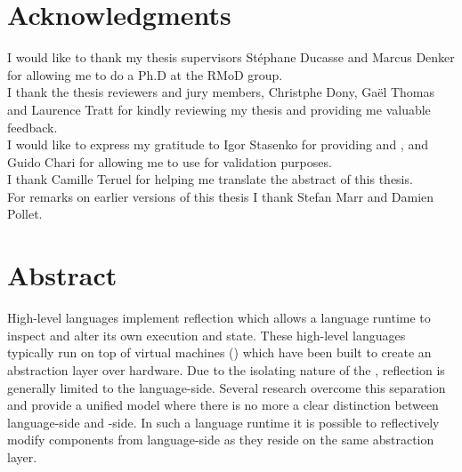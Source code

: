 \documentclass[a4paper,11pt,twoside]{include/ThesisStyle}
\begin{document}


\dominitoc

\cleardoublepage
\chapter*{Acknowledgments}

I would like to thank my thesis supervisors Stéphane Ducasse and Marcus Denker for allowing me to do a Ph.D at the RMoD group.\\

\noindent I thank the thesis reviewers and jury members, Christphe Dony, Gaël Thomas and Laurence Tratt for kindly reviewing my thesis and providing me valuable feedback.\\

\noindent I would like to express my gratitude to Igor Stasenko for providing \B and \NB, and Guido Chari for allowing me to use \WF for validation purposes.\\

\noindent I thank Camille Teruel for helping me translate the abstract of this thesis. \\

\noindent For remarks on earlier versions of this thesis I thank Stefan Marr and Damien Pollet.



\chapter*{Abstract}
High-level languages implement reflection which allows a language runtime to inspect and alter its own execution and state.
These high-level languages typically run on top of virtual machines (\VMs) which have been built to create an abstraction layer over hardware.
Due to the isolating nature of the \VM, reflection is generally limited to the language-side.
Several research \VMs overcome this separation and provide a unified model where there is no more a clear distinction between language-side and \VM-side.
In such a language runtime it is possible to reflectively modify \VM components from language-side as they reside on the same abstraction layer.
\end{document}
